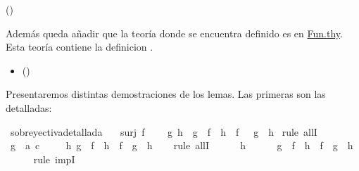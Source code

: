 \begin{isabellebody}
\begin{isamarkuptext}
\begin{itemize}
      \hfill ()
  \end{itemize} 
Además queda añadir que la teoría donde se encuentra definido
  es en \href{http://bit.ly/2XuPQx5}{Fun.thy}. Esta
 teoría contiene la definicion .
 \begin{itemize}
    \item[] 
 \hfill ()
  \end{itemize} 

Presentaremos distintas demostraciones de los lemas. Las primeras son
 las detalladas:%
\end{isamarkuptext}\isamarkuptrue%
\isanewline
{}\isamarkupfalse%
\ sobreyectivadetallada{\isacharcolon}\isanewline
\ \ \ {\isachardoublequoteopen}surj\ f{\isachardoublequoteclose}\ \isanewline
\ \ \ {\isachardoublequoteopen}{\isasymforall}g\ h{\isachardot}\ {\isacharparenleft}\ g\ {\isasymcirc}\ f\ {\isacharequal}\ h\ {\isasymcirc}\ f\ {\isacharparenright}\ {\isasymlongrightarrow}\ {\isacharparenleft}g\ {\isacharequal}\ h{\isacharparenright}{\isachardoublequoteclose}\isanewline
%
\isadelimproof
%
\endisadelimproof
%
\isatagproof
{}\isamarkupfalse%
\ {\isacharparenleft}rule\ allI{\isacharparenright}\isanewline
\ \ \isamarkupfalse%
\ g\ {\isacharcolon}{\isacharcolon}\ {\isachardoublequoteopen}{\isacharprime}a\ {\isasymRightarrow}{\isacharprime}c{\isachardoublequoteclose}\ \isanewline
\ \ \isamarkupfalse%
\ {\isachardoublequoteopen}{\isasymforall}h{\isachardot}\ {\isacharparenleft}g\ {\isasymcirc}\ f\ {\isacharequal}\ h\ {\isasymcirc}\ f{\isacharparenright}\ {\isasymlongrightarrow}\ {\isacharparenleft}g\ {\isacharequal}\ h{\isacharparenright}{\isachardoublequoteclose}\isanewline
\ \ \isamarkupfalse%
\ {\isacharparenleft}rule\ allI{\isacharparenright}\isanewline
\ \ \ \ \isamarkupfalse%
\ h\isanewline
\ \ \ \ \isamarkupfalse%
\ {\isachardoublequoteopen}{\isacharparenleft}g\ {\isasymcirc}\ f\ {\isacharequal}\ h\ {\isasymcirc}\ f{\isacharparenright}\ {\isasymlongrightarrow}\ {\isacharparenleft}g\ {\isacharequal}\ h{\isacharparenright}{\isachardoublequoteclose}\ \isanewline
\ \ \ \ \isamarkupfalse%
\ {\isacharparenleft}rule\ impI{\isacharparenright}\isanewline

\end{isabellebody}
